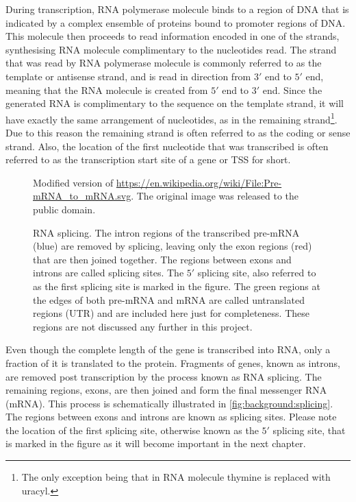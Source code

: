 \documentclass[parskip]{cs4rep}
\begin{document}
During transcription, RNA polymerase molecule binds to a region of DNA that is indicated by a complex ensemble of proteins bound to promoter regions of DNA. This molecule then proceeds to read information encoded in one of the strands, synthesising RNA molecule complimentary to the nucleotides read. The strand that was read by RNA polymerase molecule is commonly referred to as the template or antisense strand, and is read in direction from $3'$ end to $5'$ end, meaning that the RNA molecule is created from $5'$ end to $3'$ end. 
Since the generated RNA is complimentary to the sequence on the template strand, it will have exactly the same arrangement of nucleotides, as in the remaining strand\footnote{The only exception being that in RNA molecule thymine is replaced with uracyl.}. Due to this reason the remaining strand is often referred to as the coding or sense strand.
Also, the location of the first nucleotide that was transcribed is often referred to as the transcription start site of a gene or TSS for short.

\begin{figure}[t]
\centering
{}
{\centering Modified version of \url{https://en.wikipedia.org/wiki/File:Pre-mRNA_to_mRNA.svg}. The original image was released to the public domain.}
\caption{RNA splicing. The intron regions of the transcribed pre-mRNA (blue) are removed by splicing, leaving only the exon regions (red) that are then joined together. The regions between exons and introns are called splicing sites. The $5'$ splicing site, also referred to as the first splicing site is marked in the figure. 
The green regions at the edges of both pre-mRNA and mRNA are called untranslated regions (UTR) and are included here just for completeness. These regions are not discussed any further in this project.}
\label{fig:background:splicing}
\end{figure}

Even though the complete length of the gene is transcribed into RNA, only a fraction of it is translated to the protein. Fragments of genes, known as introns, are removed post transcription by the process known as RNA splicing. The remaining regions, exons, are then joined and form the final messenger RNA (mRNA). This process is schematically illustrated in \autoref{fig:background:splicing}. The regions between exons and introns are known as splicing sites. Please note the location of the first splicing site, otherwise known as the $5'$ splicing site, that is marked in the figure as it will become important in the next chapter. 
\end{document}
